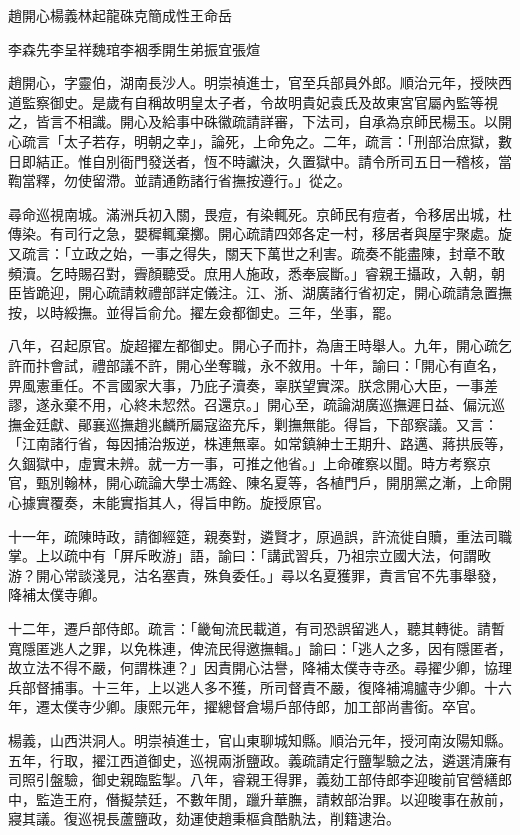 
\begin{pinyinscope}
趙開心楊義林起龍硃克簡成性王命岳

李森先李呈祥魏琯李裀季開生弟振宜張煊

趙開心，字靈伯，湖南長沙人。明崇禎進士，官至兵部員外郎。順治元年，授陜西道監察御史。是歲有自稱故明皇太子者，令故明貴妃袁氏及故東宮官屬內監等視之，皆言不相識。開心及給事中硃徽疏請詳審，下法司，自承為京師民楊玉。以開心疏言「太子若存，明朝之幸」，論死，上命免之。二年，疏言：「刑部治庶獄，數日即結正。惟自別衙門發送者，恆不時讞決，久置獄中。請令所司五日一稽核，當鞫當釋，勿使留滯。並請通飭諸行省撫按遵行。」從之。

尋命巡視南城。滿洲兵初入關，畏痘，有染輒死。京師民有痘者，令移居出城，杜傳染。有司行之急，嬰穉輒棄擲。開心疏請四郊各定一村，移居者與屋宇聚處。旋又疏言：「立政之始，一事之得失，關天下萬世之利害。疏奏不能盡陳，封章不敢頻瀆。乞時賜召對，霽顏聽受。庶用人施政，悉奉宸斷。」睿親王攝政，入朝，朝臣皆跪迎，開心疏請敕禮部詳定儀注。江、浙、湖廣諸行省初定，開心疏請急置撫按，以時綏撫。並得旨俞允。擢左僉都御史。三年，坐事，罷。

八年，召起原官。旋超擢左都御史。開心子而抃，為唐王時舉人。九年，開心疏乞許而抃會試，禮部議不許，開心坐奪職，永不敘用。十年，諭曰：「開心有直名，畀風憲重任。不言國家大事，乃庇子瀆奏，辜朕望實深。朕念開心大臣，一事差謬，遂永棄不用，心終未恝然。召還京。」開心至，疏論湖廣巡撫遲日益、偏沅巡撫金廷獻、鄖襄巡撫趙兆麟所屬寇盜充斥，剿撫無能。得旨，下部察議。又言：「江南諸行省，每因捕治叛逆，株連無辜。如常鎮紳士王期升、路邁、蔣拱辰等，久錮獄中，虛實未辨。就一方一事，可推之他省。」上命確察以聞。時方考察京官，甄別翰林，開心疏論大學士馮銓、陳名夏等，各植門戶，開朋黨之漸，上命開心據實覆奏，未能實指其人，得旨申飭。旋授原官。

十一年，疏陳時政，請御經筵，親奏對，遴賢才，原過誤，許流徙自贖，重法司職掌。上以疏中有「屏斥畋游」語，諭曰：「講武習兵，乃祖宗立國大法，何謂畋游？開心常談淺見，沽名塞責，殊負委任。」尋以名夏獲罪，責言官不先事舉發，降補太僕寺卿。

十二年，遷戶部侍郎。疏言：「畿甸流民載道，有司恐誤留逃人，聽其轉徙。請暫寬隱匿逃人之罪，以免株連，俾流民得邀撫輯。」諭曰：「逃人之多，因有隱匿者，故立法不得不嚴，何謂株連？」因責開心沽譽，降補太僕寺寺丞。尋擢少卿，協理兵部督捕事。十三年，上以逃人多不獲，所司督責不嚴，復降補鴻臚寺少卿。十六年，遷太僕寺少卿。康熙元年，擢總督倉場戶部侍郎，加工部尚書銜。卒官。

楊義，山西洪洞人。明崇禎進士，官山東聊城知縣。順治元年，授河南汝陽知縣。五年，行取，擢江西道御史，巡視兩浙鹽政。義疏請定行鹽掣驗之法，遴選清廉有司照引盤驗，御史親臨監掣。八年，睿親王得罪，義劾工部侍郎李迎晙前官營繕郎中，監造王府，僭擬禁廷，不數年閒，躐升華膴，請敕部治罪。以迎晙事在赦前，寢其議。復巡視長蘆鹽政，劾運使趙秉樞貪酷骫法，削籍逮治。


\end{pinyinscope}
